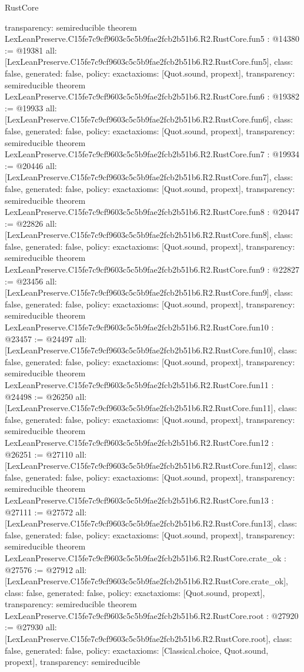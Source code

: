 \begin{lexlean}{RustCore}
\begin{coremodule}
{  transparency: semireducible
}
theorem LexLeanPreserve.C15fe7c9cf9603c5c5b9fae2fcb2b51b6.R2.RustCore.fun5 : @14380 := @19381 {
  all: [LexLeanPreserve.C15fe7c9cf9603c5c5b9fae2fcb2b51b6.R2.RustCore.fun5],
  class: false,
  generated: false,
  policy: exact{axioms: [Quot.sound, propext]},
  transparency: semireducible
}
theorem LexLeanPreserve.C15fe7c9cf9603c5c5b9fae2fcb2b51b6.R2.RustCore.fun6 : @19382 := @19933 {
  all: [LexLeanPreserve.C15fe7c9cf9603c5c5b9fae2fcb2b51b6.R2.RustCore.fun6],
  class: false,
  generated: false,
  policy: exact{axioms: [Quot.sound, propext]},
  transparency: semireducible
}
theorem LexLeanPreserve.C15fe7c9cf9603c5c5b9fae2fcb2b51b6.R2.RustCore.fun7 : @19934 := @20446 {
  all: [LexLeanPreserve.C15fe7c9cf9603c5c5b9fae2fcb2b51b6.R2.RustCore.fun7],
  class: false,
  generated: false,
  policy: exact{axioms: [Quot.sound, propext]},
  transparency: semireducible
}
theorem LexLeanPreserve.C15fe7c9cf9603c5c5b9fae2fcb2b51b6.R2.RustCore.fun8 : @20447 := @22826 {
  all: [LexLeanPreserve.C15fe7c9cf9603c5c5b9fae2fcb2b51b6.R2.RustCore.fun8],
  class: false,
  generated: false,
  policy: exact{axioms: [Quot.sound, propext]},
  transparency: semireducible
}
theorem LexLeanPreserve.C15fe7c9cf9603c5c5b9fae2fcb2b51b6.R2.RustCore.fun9 : @22827 := @23456 {
  all: [LexLeanPreserve.C15fe7c9cf9603c5c5b9fae2fcb2b51b6.R2.RustCore.fun9],
  class: false,
  generated: false,
  policy: exact{axioms: [Quot.sound, propext]},
  transparency: semireducible
}
theorem LexLeanPreserve.C15fe7c9cf9603c5c5b9fae2fcb2b51b6.R2.RustCore.fun10 : @23457 := @24497 {
  all: [LexLeanPreserve.C15fe7c9cf9603c5c5b9fae2fcb2b51b6.R2.RustCore.fun10],
  class: false,
  generated: false,
  policy: exact{axioms: [Quot.sound, propext]},
  transparency: semireducible
}
theorem LexLeanPreserve.C15fe7c9cf9603c5c5b9fae2fcb2b51b6.R2.RustCore.fun11 : @24498 := @26250 {
  all: [LexLeanPreserve.C15fe7c9cf9603c5c5b9fae2fcb2b51b6.R2.RustCore.fun11],
  class: false,
  generated: false,
  policy: exact{axioms: [Quot.sound, propext]},
  transparency: semireducible
}
theorem LexLeanPreserve.C15fe7c9cf9603c5c5b9fae2fcb2b51b6.R2.RustCore.fun12 : @26251 := @27110 {
  all: [LexLeanPreserve.C15fe7c9cf9603c5c5b9fae2fcb2b51b6.R2.RustCore.fun12],
  class: false,
  generated: false,
  policy: exact{axioms: [Quot.sound, propext]},
  transparency: semireducible
}
theorem LexLeanPreserve.C15fe7c9cf9603c5c5b9fae2fcb2b51b6.R2.RustCore.fun13 : @27111 := @27572 {
  all: [LexLeanPreserve.C15fe7c9cf9603c5c5b9fae2fcb2b51b6.R2.RustCore.fun13],
  class: false,
  generated: false,
  policy: exact{axioms: [Quot.sound, propext]},
  transparency: semireducible
}
theorem LexLeanPreserve.C15fe7c9cf9603c5c5b9fae2fcb2b51b6.R2.RustCore.crate_ok : @27576 := @27912 {
  all: [LexLeanPreserve.C15fe7c9cf9603c5c5b9fae2fcb2b51b6.R2.RustCore.crate_ok],
  class: false,
  generated: false,
  policy: exact{axioms: [Quot.sound, propext]},
  transparency: semireducible
}
theorem LexLeanPreserve.C15fe7c9cf9603c5c5b9fae2fcb2b51b6.R2.RustCore.root : @27920 := @27930 {
  all: [LexLeanPreserve.C15fe7c9cf9603c5c5b9fae2fcb2b51b6.R2.RustCore.root],
  class: false,
  generated: false,
  policy: exact{axioms: [Classical.choice, Quot.sound, propext]},
  transparency: semireducible
}


\end{coremodule}
\end{lexlean}
